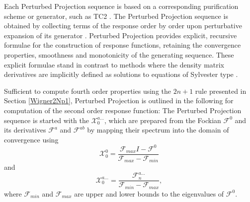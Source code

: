 \documentclass[prl,twocolumn,showpacs,twocolumngrid,superbib]{revtex4}
\def\F{\mathcal{F}}
\def\X{\mathcal{X}}
\begin{document}
Each Perturbed Projection sequence is based on a corresponding  purification scheme or generator, such as TC2 \cite{ANiklasson02A}.   
The Perturbed Projection sequence is obtained by collecting terms of the response order by 
order upon perturbative expansion of its generator \cite{ANiklasson04}.
Perturbed Projection provides explicit, recursive formulae 
for the construction of response functions, retaining the convergence properties,  smoothness and 
monotonicity of the generating sequence.   These explicit formulae stand in contrast to methods where the 
density matrix derivatives are implicitly defined as solutions to equations of Sylvester type \cite{Ochsenfeld97,HLarsen01a,COchsenfeld04}.

Sufficient to compute fourth order properties using the $2 n+1$ rule presented in Section \ref{Wigner2Np1}, 
Perturbed Projection is outlined in the following for computation of the second order response function:  
The Perturbed Projection sequence is started with the  $\X^{a\ldots}_{0}$, which are 
prepared from the Fockian $\F^0$ and its derivatives $\F^a$ and $\F^{ab}$ by  mapping their spectrum 
into the domain of convergence \cite{ANiklasson02A} using
\begin{equation}
    \X^0_{0}=\frac{\F_{max}I-\F^0}{\F_{max}-\F_{min}} 
\end{equation}
and 
\begin{equation}
    \X^{a\ldots}_{0}=\frac{\F^{a\ldots}_{n}}{\F_{min}-\F_{max}},
\end{equation}
where $\F_{min}$ and $\F_{max}$ are upper and lower bounds to the eigenvalues of $\F^0$.  
\end{document}
